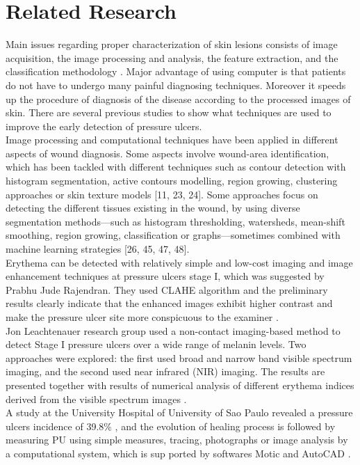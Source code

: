 \section{Related Research}
Main issues regarding proper characterization of skin lesions consists of image acquisition, the image processing and analysis, the feature extraction, and the classification methodology \cite{Patel}. Major advantage of using computer is that patients do not have to undergo many painful diagnosing techniques. Moreover it speeds up the procedure of diagnosis of the disease according to the processed images of skin. There are several previous studies to show what techniques are used to improve the early detection of pressure ulcers.\\
\indent Image processing and computational techniques have been applied in different aspects of wound diagnosis. Some aspects involve wound-area identification, which has been tackled with different techniques such as contour detection with
histogram segmentation, active contours modelling, region growing, clustering approaches or skin texture models [11, 23, 24]. Some approaches focus on
detecting the different tissues existing in the wound, by using diverse segmentation methods—such as histogram thresholding, watersheds, mean-shift smoothing, region growing, classification or graphs—sometimes combined with machine learning strategies [26, 45, 47, 48].\\
\indent Erythema can be detected with relatively simple and low-cost imaging and image enhancement techniques at pressure ulcers stage I, which was suggested by Prabhu Jude Rajendran. They used CLAHE algorithm and the preliminary results clearly indicate that the enhanced images exhibit higher contrast and make the pressure ulcer site more conspicuous to the examiner \cite{Rajendran}.\\
\indent Jon Leachtenauer research group used a non-contact imaging-based method to detect Stage I pressure ulcers over a wide range of melanin levels. Two approaches were explored: the first used broad and narrow band visible spectrum imaging, and the second used near infrared (NIR) imaging. The results are presented together with results of numerical analysis of different erythema indices derived from the visible spectrum images \cite{Leachtenauer}. \\
\indent A study at the University Hospital of University of Sao Paulo revealed a pressure ulcers incidence of 39.8\% \cite{Rogenski}, and the evolution of healing process is followed by measuring PU using simple measures, tracing, photographs or image analysis by a computational system, which is sup ported by softwares Motic and AutoCAD \cite{minister}.\\
